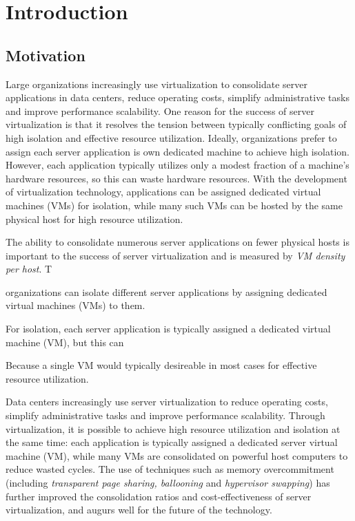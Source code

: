 \chapter{Introduction}
\section{Motivation}
Large organizations increasingly use virtualization to consolidate server 
applications in data centers, reduce operating costs, simplify administrative
tasks and improve performance scalability. One reason for the success of 
server virtualization is that it resolves the tension between typically conflicting
goals of high isolation and effective resource utilization.
Ideally, organizations prefer to assign each server
application is own dedicated machine to achieve high isolation.
However, each application typically utilizes only a modest fraction of a 
machine's hardware resources, so this can waste hardware resources.
With the development of virtualization technology, applications
can be assigned dedicated virtual machines (VMs) for isolation,
while many such VMs can be hosted by the same physical
host for high resource utilization.

The ability to consolidate numerous server applications
on fewer physical hosts is important to the success
of server virtualization and is measured
by {\em VM density per host}. T




organizations can isolate different server
applications by assigning dedicated virtual machines (VMs)
to them.



For isolation, each server application is typically
assigned a dedicated virtual machine (VM),
but this can 

Because a single VM would typically 
desireable in most cases for effective resource utilization. 





Data centers increasingly use server virtualization to
reduce operating costs, simplify administrative tasks and improve 
performance scalability. Through virtualization, it is
possible to achieve high resource utilization and isolation at the same time:
each application is typically assigned a dedicated server virtual machine (VM), 
while many VMs are consolidated on powerful host computers
to reduce wasted cycles. The use of techniques such as memory overcommitment (including 
\emph{transparent page sharing, ballooning} and \emph{hypervisor swapping}) \cite{waldspurger2002memory} 
has further improved the consolidation ratios and cost-effectiveness 
of server virtualization, and augurs well for the future of the technology.

